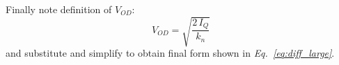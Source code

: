 Finally note definition of $V_{OD}$:
    \begin{equation}
        V_{OD} = \sqrt{\frac{2\,I_Q}{k_n}}
    \end{equation}
and substitute and simplify to obtain final form shown in \emph{Eq.~\ref{eq:diff_large}}.
